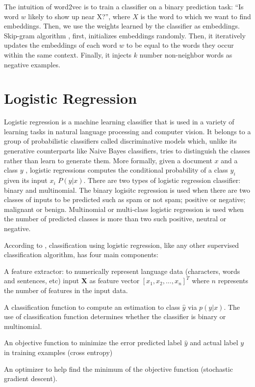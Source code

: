 The intuition of word2vec is to train a classifier on a binary prediction task: “Is
word $w$ likely to show up near X?”, where $X$ is the word to which we want to find embeddings. Then, we use the weights learned by the classifier as embeddings. Skip-gram algorithm \citep{mikolov2013distributed} , first, initializes embeddings randomly. Then, it iteratively updates the embeddings of each word $w$ to be equal to the words they occur within the same context. Finally, it injects $k$ number non-neighbor words as negative examples. 

\section{Logistic Regression}

Logistic regression is a machine learning classifier that is used in a variety of learning tasks in natural language processing and computer vision. It belongs to a group of probabilistic classifiers called discriminative models which, unlike its generative counterparts like Naive Bayes classifiers, tries to distinguish the classes rather than learn to generate them. More formally, given a document $x$ and a class $y$ , logistic regressions computes the conditional probability of a class $y_i$ given its input $x_i$ $P(y|x)$. There are two types of logistic regression classifier: binary and multinomial. The binary logisitc regression is used when there are two classes of inputs to be predicted such as spam or not spam; positive or negative; malignant or benign. Multinomial or multi-class logistic regression is used when the number of predicted classes is more than two such positive, neutral or negative.

 According to \citep{jurafsky2014speech}, classification using logistic regression, like any other supervised classification algorithm, has four main components: 

\begin{list}{•}{}
 \item A feature extractor: to numerically represent language data (characters, words and sentences, etc) input $\mathbf{X}$ as feature vector $\left[x_1,x_2,\ldots,x_n \right]^T$ where $n$  represents the number of features in the input data.

\item A classification function to compute an estimation to class $\hat{y}$ via $p(y|x)$. The use of classification function determines whether the classifier is binary or multinomial. 
 
\item An objective function to minimize the error predicted label $\hat{y}$ and actual label $y$ in training examples (cross entropy)

\item An optimizer to help find the minimum of the objective function 
 (stochastic gradient descent).
 \end{list}

